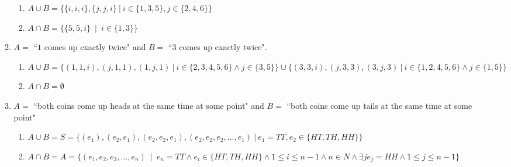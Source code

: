 \documentclass[11pt]{article}
\begin{document}
\begin{enumerate}
\begin{enumerate}
\begin {enumerate}
\item $A \cup B = \{ \{i, i, i\}, \{j, j, i\} \: | \: i \in \{1, 3, 5 \}, j \in \{2, 4, 6\}\} $ 
\item $A \cap B = \{\{5, 5, i\} \: \mid \: i \in \{1,3\}\} $

\end {enumerate}

\item $A =$ ``$1$ comes up exactly twice" and $B = $ ``$3$ comes up exactly
twice".


\begin {enumerate}

\item $A \cup B = \{(1,1,i), (j, 1, 1), (1, j, 1) \: | \: i \in \{2,3,4,5,6\} \land j \in \{3,5\} \} \cup \{(3,3,i), (j, 3, 3), (3, j, 3) \: | \: i \in \{1,2,4,5,6\} \land j \in \{1,5\} \} $

\item $A \cap B = \emptyset $

\end {enumerate}

\item $A =$ ``both coins come up heads at the same time at some point" 
and $B = $ ``both coins come up tails at the same time at some point"


\begin {enumerate}

\item $A \cup B = S = \{ (e_1), (e_2,e_1), (e_2,e_2,e_1), (e_2,e_2,e_2, ..., e_1) \: | \:e_1 = TT, e_2 \in \{HT, TH, HH\}\}$ 
\item $A \cap B = A = \{ (e_1, e_2, e_3, ... , e_n) \: \mid \: e_n = TT \land e_i \in \{HT, TH, HH\} \land 1 \le i \le n - 1 \land n \in N \land \exists j e_j = HH \land 1 \le j \le n - 1 \}$




\end{enumerate}
\end{enumerate}
\end{enumerate}
\end{document}
